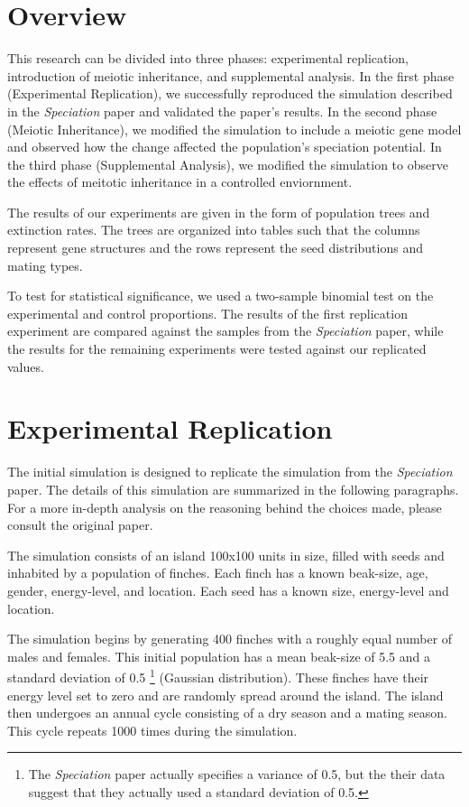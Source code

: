 \documentclass{article}
\begin{document}
\section{Overview}

This research can be divided into three phases: experimental replication, introduction of meiotic inheritance, and supplemental analysis. In the first phase (Experimental Replication), we successfully reproduced the simulation described in the \textit{Speciation} paper and validated the paper's results. In the second phase (Meiotic Inheritance), we modified the simulation to include a meiotic gene model and observed how the change affected the population's speciation potential. In the third phase (Supplemental Analysis), we modified the simulation to observe the effects of meitotic inheritance in a controlled enviornment. 

The results of our experiments are given in the form of population trees and extinction rates. The trees are organized into tables such that the columns represent gene structures and the rows represent the seed distributions and mating types.

To test for statistical significance, we used a two-sample binomial test on the experimental and control proportions. The results of the first replication experiment are compared against the samples from the \textit{Speciation} paper, while the results for the remaining experiments were tested against our replicated values. 



\section{Experimental Replication}

The initial simulation is designed to replicate the simulation from the \textit{Speciation} paper. The details of this simulation are summarized in the following paragraphs. For a more in-depth analysis on the reasoning behind the choices made, please consult the original paper. 

The simulation consists of an island 100x100 units in size, filled with seeds and inhabited by a population of finches. Each finch has a known beak-size, age, gender, energy-level, and location. Each seed has a known size, energy-level and location.

The simulation begins by generating 400 finches with a roughly equal number of males and females. This initial population has a mean beak-size of 5.5 and a standard deviation of 0.5 \footnote{The \textit{Speciation} paper actually specifies a variance of 0.5, but the their data suggest that they actually used a standard deviation of 0.5.} (Gaussian distribution). These finches have their energy level set to zero and are randomly spread around the island. The island then undergoes an annual cycle consisting of a dry season and a mating season. This cycle repeats 1000 times during the simulation. 
\end{document}
